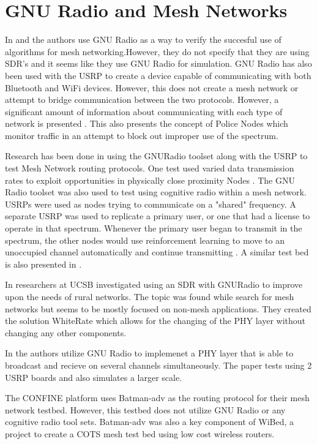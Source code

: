 \section{GNU Radio and Mesh Networks}

In \cite{4509617} and \cite{5062250} the authors use GNU Radio as a way to verify the succesful use of algorithms for mesh 
networking.However, they do not specify that they are using SDR's and it seems like they use GNU Radio for simulation. GNU Radio has
also been used with the USRP to create a device capable of communicating with both Bluetooth and WiFi devices. However, this does not
create a mesh network or attempt to bridge communication between the two protocols. However, a significant amount of information about
communicating with each type of network is presented \cite{4292880}. This also presents the concept of Police Nodes which monitor
traffic in an attempt to block out improper use of the spectrum. 

Research has been done in using the GNURadio toolset along with the USRP to test Mesh Network routing protocols. One test 
used varied data transmission rates to exploit opportunities in physically close proximity Nodes \cite{5462112}. The GNU Radio 
toolset was also used to test using cognitive radio within a mesh network. USRPs were used as nodes trying to communicate on a
"shared" frequency. A separate USRP was used to replicate a primary user, or one that had a license to operate in that spectrum. 
Whenever the primary user began to transmit in the spectrum, the other nodes would use reinforcement learning to move to an 
unoccupied channel automatically and continue transmitting \cite{7141228}. A similar test bed is also presented in \cite{5508221}.

In \cite{5984947} researchers at UCSB investigated using an SDR with GNURadio to
improve upon the needs of rural networks. The topic was found while search for mesh
networks but seems to be mostly focused on non-mesh applications. They created
the solution WhiteRate which allows for the changing of the PHY layer without 
changing any other components. 

In \cite{5462039} the authors utilize GNU Radio to implemenet a PHY layer that is 
able to broadcast and recieve on several channels simultaneously. The paper
tests using 2 USRP boards and also simulates a larger scale.  

The CONFINE platform uses Batman-adv as the routing protocol for their mesh network testbed. However,
this testbed does not utilize GNU Radio or any cognitive radio tool sets. \cite{0001} Batman-adv 
was also a key component of WiBed, a project to create a COTS mesh test bed using low cost wireless
routers. \cite{6686492} \cite{6962154}
